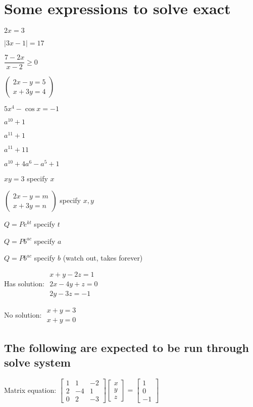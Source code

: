 \documentclass{article}
\begin{document}
\section{Some expressions to solve exact}

$2x=3$

$\left\vert 3x-1\right\vert =17$

$\dfrac{7-2x}{x-2}\geq 0$

$\left( 
\begin{array}{c}
2x-y=5 \\ 
x+3y=4%
\end{array}%
\right) $

$5x^{4}-\cos x=-1$

$a^{10}+1$

$a^{11}+1$

$a^{11}+11$

$a^{10}+4a^{6}-a^{5}+1$

$xy=3$ specify $x$

$\left( 
\begin{array}{c}
2x-y=m \\ 
x+3y=n%
\end{array}%
\right) $ specify $x,y$

$Q=Pe^{kt}$ specify $t$

$Q=Pb^{ac}$ specify $a$

$Q=Pb^{ac}$ specify $b$ (watch out, takes forever)

Has solution: $%
\begin{array}{l}
x+y-2z=1 \\ 
2x-4y+z=0 \\ 
2y-3z=-1%
\end{array}%
$

No solution: $%
\begin{array}{c}
x+y=3 \\ 
x+y=0%
\end{array}%
$

\subsection{The following are expected to be run through solve system}

Matrix equation: $\left[ 
\begin{array}{rrr}
1 & 1 & -2 \\ 
2 & -4 & 1 \\ 
0 & 2 & -3%
\end{array}%
\right] \left[ 
\begin{array}{c}
x \\ 
y \\ 
z%
\end{array}%
\right] =\left[ 
\begin{array}{c}
1 \\ 
0 \\ 
-1%
\end{array}%
\right] $
\end{document}
